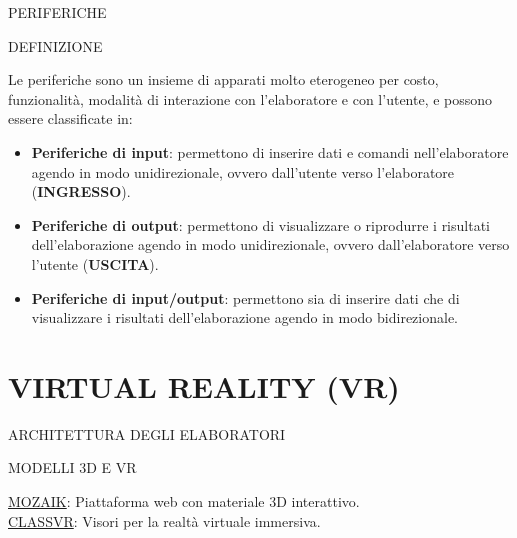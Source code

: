 \documentclass[aspectratio=1610]{beamer}
\begin{document}
\begin{frame}{PERIFERICHE}
    \begin{alertblock}{DEFINIZIONE}
        \begin{minipage}{0.98\linewidth}
            \justifying
            Le periferiche sono un insieme di apparati molto eterogeneo per costo, funzionalità, modalità 
            di interazione con l'elaboratore e con l'utente, e possono essere classificate in:
            \bigskip
            \begin{itemize}
                \justifying
                \pause
                \item \textbf{Periferiche di input}: permettono di inserire dati e comandi nell'elaboratore agendo in 
                modo unidirezionale, ovvero dall'utente verso l'elaboratore (\textbf{INGRESSO}).
                \pause
                \item \textbf{Periferiche di output}: permettono di visualizzare o riprodurre i risultati dell'elaborazione 
                agendo in modo unidirezionale, ovvero dall'elaboratore verso l'utente (\textbf{USCITA}).
                \pause
                \item \textbf{Periferiche di input/output}: permettono sia di inserire dati che di visualizzare 
                i risultati dell'elaborazione agendo in modo bidirezionale.
            \end{itemize}
            \bigskip
        \end{minipage}
    \end{alertblock}
\end{frame}

\section{VIRTUAL REALITY (VR)}

\begin{frame}{ARCHITETTURA DEGLI ELABORATORI}
    \begin{alertblock}{MODELLI 3D E VR}
        \begin{minipage}{0.98\linewidth}
            \justifying
            \bigskip
            \href{https://www.mozaweb.com/MyLearn/collections?folder=367207&view_type=own&data_view=grid&from_coll_page=1&field=modify_time}{MOZAIK}: 
            Piattaforma web con materiale 3D interattivo. \\
            \bigskip
            \href{https://portal.classvr.com/connect/player/index.cfm\#categoryid=1035193188}{CLASSVR}: 
            Visori per la realtà virtuale immersiva.
        \end{minipage}
    \end{alertblock}
\end{frame}
\end{document}
